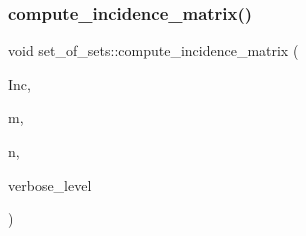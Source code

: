 \mbox{\label{classset__of__sets_a9c9123ae231d922469ac939b42567433}} 
\subsubsection{\texorpdfstring{compute\+\_\+incidence\+\_\+matrix()}{compute\_incidence\_matrix()}}
{\footnotesize\ttfamily void set\+\_\+of\+\_\+sets\+::compute\+\_\+incidence\+\_\+matrix (\begin{DoxyParamCaption}\item[{\mbox{\hyperlink{galois_8h_a09fddde158a3a20bd2dcadb609de11dc}{I\+NT}} $\ast$\&}]{Inc,  }\item[{\mbox{\hyperlink{galois_8h_a09fddde158a3a20bd2dcadb609de11dc}{I\+NT}} \&}]{m,  }\item[{\mbox{\hyperlink{galois_8h_a09fddde158a3a20bd2dcadb609de11dc}{I\+NT}} \&}]{n,  }\item[{\mbox{\hyperlink{galois_8h_a09fddde158a3a20bd2dcadb609de11dc}{I\+NT}}}]{verbose\+\_\+level }\end{DoxyParamCaption})}

\mbox{\label{classset__of__sets_a309468ec81c5428e047804244fb7b2f4}} 
